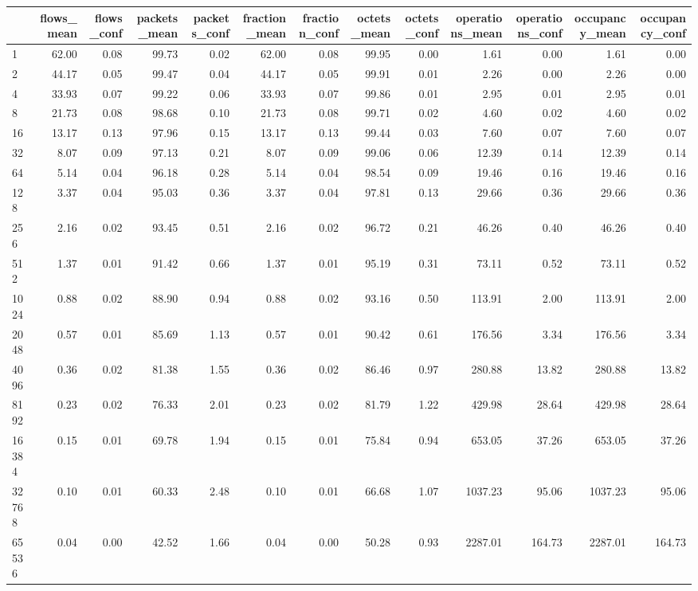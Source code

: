 \begin{tabular}{lrrrrrrrrrrrr}
\toprule
 & flows_mean & flows_conf & packets_mean & packets_conf & fraction_mean & fraction_conf & octets_mean & octets_conf & operations_mean & operations_conf & occupancy_mean & occupancy_conf \\
\midrule
1 & 62.00 & 0.08 & 99.73 & 0.02 & 62.00 & 0.08 & 99.95 & 0.00 & 1.61 & 0.00 & 1.61 & 0.00 \\
2 & 44.17 & 0.05 & 99.47 & 0.04 & 44.17 & 0.05 & 99.91 & 0.01 & 2.26 & 0.00 & 2.26 & 0.00 \\
4 & 33.93 & 0.07 & 99.22 & 0.06 & 33.93 & 0.07 & 99.86 & 0.01 & 2.95 & 0.01 & 2.95 & 0.01 \\
8 & 21.73 & 0.08 & 98.68 & 0.10 & 21.73 & 0.08 & 99.71 & 0.02 & 4.60 & 0.02 & 4.60 & 0.02 \\
16 & 13.17 & 0.13 & 97.96 & 0.15 & 13.17 & 0.13 & 99.44 & 0.03 & 7.60 & 0.07 & 7.60 & 0.07 \\
32 & 8.07 & 0.09 & 97.13 & 0.21 & 8.07 & 0.09 & 99.06 & 0.06 & 12.39 & 0.14 & 12.39 & 0.14 \\
64 & 5.14 & 0.04 & 96.18 & 0.28 & 5.14 & 0.04 & 98.54 & 0.09 & 19.46 & 0.16 & 19.46 & 0.16 \\
128 & 3.37 & 0.04 & 95.03 & 0.36 & 3.37 & 0.04 & 97.81 & 0.13 & 29.66 & 0.36 & 29.66 & 0.36 \\
256 & 2.16 & 0.02 & 93.45 & 0.51 & 2.16 & 0.02 & 96.72 & 0.21 & 46.26 & 0.40 & 46.26 & 0.40 \\
512 & 1.37 & 0.01 & 91.42 & 0.66 & 1.37 & 0.01 & 95.19 & 0.31 & 73.11 & 0.52 & 73.11 & 0.52 \\
1024 & 0.88 & 0.02 & 88.90 & 0.94 & 0.88 & 0.02 & 93.16 & 0.50 & 113.91 & 2.00 & 113.91 & 2.00 \\
2048 & 0.57 & 0.01 & 85.69 & 1.13 & 0.57 & 0.01 & 90.42 & 0.61 & 176.56 & 3.34 & 176.56 & 3.34 \\
4096 & 0.36 & 0.02 & 81.38 & 1.55 & 0.36 & 0.02 & 86.46 & 0.97 & 280.88 & 13.82 & 280.88 & 13.82 \\
8192 & 0.23 & 0.02 & 76.33 & 2.01 & 0.23 & 0.02 & 81.79 & 1.22 & 429.98 & 28.64 & 429.98 & 28.64 \\
16384 & 0.15 & 0.01 & 69.78 & 1.94 & 0.15 & 0.01 & 75.84 & 0.94 & 653.05 & 37.26 & 653.05 & 37.26 \\
32768 & 0.10 & 0.01 & 60.33 & 2.48 & 0.10 & 0.01 & 66.68 & 1.07 & 1037.23 & 95.06 & 1037.23 & 95.06 \\
65536 & 0.04 & 0.00 & 42.52 & 1.66 & 0.04 & 0.00 & 50.28 & 0.93 & 2287.01 & 164.73 & 2287.01 & 164.73 \\

\end{tabular}

